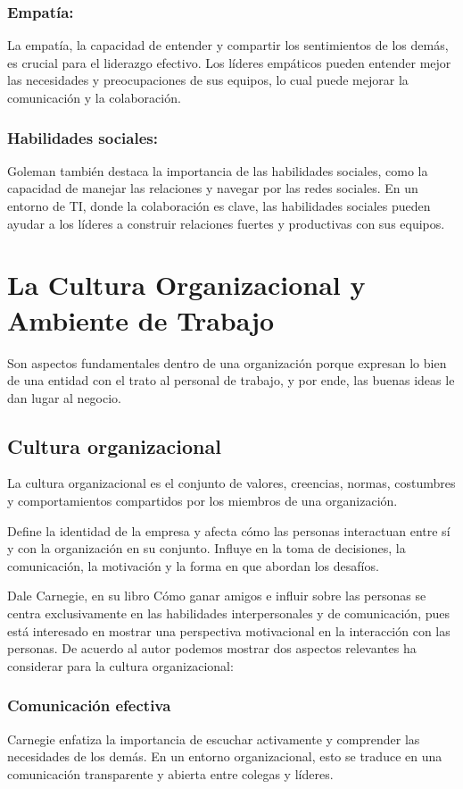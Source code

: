 \documentclass[journal]{IEEEtran}
\begin{document}
\subsubsection{Empatía:} La empatía, la capacidad de entender y compartir los sentimientos de los demás, es crucial para el liderazgo efectivo. Los líderes empáticos pueden entender mejor las necesidades y preocupaciones de sus equipos, lo cual puede mejorar la comunicación y la colaboración.
\subsubsection{Habilidades sociales:} Goleman también destaca la importancia de las habilidades sociales, como la capacidad de manejar las relaciones y navegar por las redes sociales. En un entorno de TI, donde la colaboración es clave, las habilidades sociales pueden ayudar a los líderes a construir relaciones fuertes y productivas con sus equipos.

\section{La Cultura Organizacional y Ambiente de Trabajo}
Son aspectos fundamentales dentro de una organización porque expresan lo bien de una entidad con el trato al personal de trabajo, y por ende, las buenas ideas le dan lugar al negocio.

\subsection{Cultura organizacional}
La cultura organizacional es el conjunto de valores, creencias, normas, costumbres y comportamientos compartidos por los miembros de una organización.

Define la identidad de la empresa y afecta cómo las personas interactuan entre sí y con la organización en su conjunto. Influye en la toma de decisiones, la comunicación, la motivación y la forma en que abordan los desafíos.

Dale Carnegie, en su libro Cómo ganar amigos e influir sobre las personas se centra exclusivamente en las habilidades interpersonales y de comunicación, pues está interesado en mostrar una perspectiva motivacional en la interacción con las personas. De acuerdo al autor podemos mostrar dos aspectos relevantes ha considerar para la cultura organizacional:

\subsubsection{Comunicación efectiva}
Carnegie enfatiza la importancia de escuchar activamente y comprender las necesidades de los demás. En un entorno organizacional, esto se traduce en una comunicación transparente y abierta entre colegas y líderes.
\end{document}
